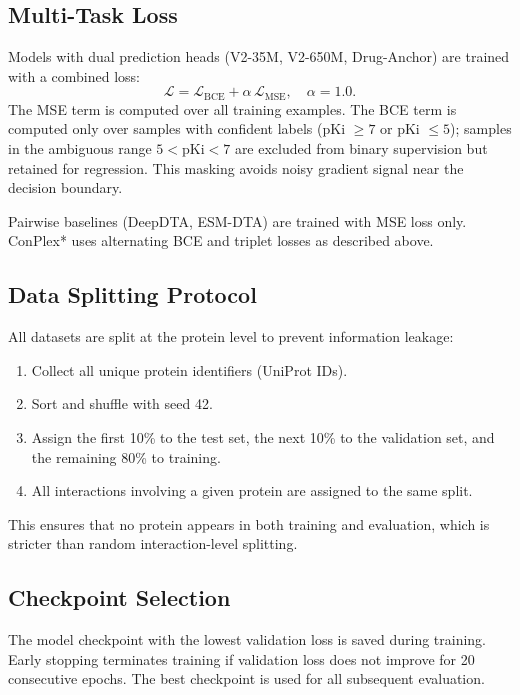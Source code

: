 \documentclass[11pt]{article}
\begin{document}
\subsection{Multi-Task Loss}

Models with dual prediction heads (V2-35M, V2-650M, Drug-Anchor) are trained with a combined loss:
\[
\mathcal{L} = \mathcal{L}_{\mathrm{BCE}} + \alpha\,\mathcal{L}_{\mathrm{MSE}}, \quad \alpha = 1.0.
\]
The MSE term is computed over all training examples. The BCE term is computed only over samples with confident labels (pKi $\geq 7$ or pKi $\leq 5$); samples in the ambiguous range $5 < \mathrm{pKi} < 7$ are excluded from binary supervision but retained for regression. This masking avoids noisy gradient signal near the decision boundary.

Pairwise baselines (DeepDTA, ESM-DTA) are trained with MSE loss only. ConPlex* uses alternating BCE and triplet losses as described above.

\subsection{Data Splitting Protocol}

All datasets are split at the protein level to prevent information leakage:
\begin{enumerate}
    \item Collect all unique protein identifiers (UniProt IDs).
    \item Sort and shuffle with seed 42.
    \item Assign the first 10\% to the test set, the next 10\% to the validation set, and the remaining 80\% to training.
    \item All interactions involving a given protein are assigned to the same split.
\end{enumerate}
This ensures that no protein appears in both training and evaluation, which is stricter than random interaction-level splitting.

\subsection{Checkpoint Selection}

The model checkpoint with the lowest validation loss is saved during training. Early stopping terminates training if validation loss does not improve for 20 consecutive epochs. The best checkpoint is used for all subsequent evaluation.

\end{document}
